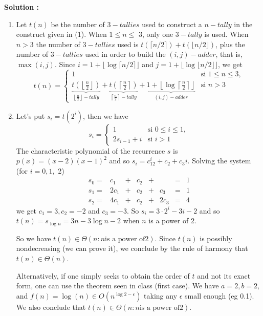 \documentclass[11pt]{article} %
\newenvironment{solution}[1][\unskip]{%
	\par
	\noindent
	\textbf{Solution #1:}
	\noindent}
{\medskip}
\begin{document}
\begin{solution}
\begin{enumerate}
			
		\item {Let $ t (n) $ be the number of $ 3-tallies $ used to construct a $ n-tally $ in the construct given in (1). When $ 1 \leq n \leq $ 3, only one $ 3-tally $ is used. When $ n> 3 $ the number of $ 3-tallies $ used is $ t (\lceil n / 2 \rceil) + t (\lfloor n / 2 \rfloor) $, plus the number of $ 3-tallies $ used in order to build the $ (i, j) -adder $, that is, $ \max (i, j) $. Since $ i = 1 + \lfloor \log \lceil n / 2 \rceil \rfloor $ and $ j = 1 + \lfloor \log \lfloor n / 2 \rfloor \rfloor $, we get
				\begin{equation}
				t(n)=\left\{
				\begin{array}{ll}
				1 & \text{si } 1\leq n \leq 3,\\\underbrace{t(\left\lfloor\frac{n}{2}\right\rfloor)}_{\left\lfloor\frac{n}{2}\right\rfloor -tally}+
				\underbrace{t(\left\lceil\frac{n}{2}\right\rceil)}_{\left\lceil\frac{n}{2}\right\rceil -tally}+  \underbrace{1 + \left\lfloor \log \left\lceil \frac{n}{2} \right\rceil \right\rfloor}_{(i,j)-adder} & \text{si } n> 3
				\end{array} \right.
				\end{equation}}
			\item{Let's put $ s_i = t (2 ^ i) $, then we have
				\begin{equation*}
				s_i=\left\{
				\begin{array}{ll}
				1 & \text{si } 0\leq i \leq 1,\\
				2s_{i-1} + i & \text{si } i>1
				\end{array} \right.
				\end{equation*}
				The characteristic polynomial of the recurrence $ s $ is $ p (x) = (x-2) (x-1) ^ 2 $ and so $ s_i = c_12 ^ i + c_2 + c_3 i $. Solving the system (for $ i = 0, 1, $ 2)
				\begin{equation*}
				\begin{array}{llllllll}
				s_0 =& c_1 & + & c_2 & + & & = & 1\\
				s_1 =& 2c_1 & + & c_2 & + & c_3 & = & 1\\
				s_2 =& 4c_1 & + & c_2 & + & 2c_3 & = & 4
				\end{array}
				\end{equation*}
				we get $ c_1 = 3, c_2 = -2 $ and $ c_3 = -3 $. So $ s_i = 3 \cdot 2 ^ i - 3i -2 $ and so $ t (n) = s _ {\log n} = 3n - 3 \log n -2 $ when $ n $ is a power of 2.

				So we have $ t (n) \in \Theta (n: n \text {is a power of} 2) $. Since $ t (n) $ is possibly nondecreasing (we can prove it), we conclude by the rule of harmony that $ t (n) \in \Theta (n) $.

				Alternatively, if one simply seeks to obtain the order of $ t $ and not its exact form, one can use the theorem seen in class (first case). We have $ a = 2, b = 2, $ and $ f (n) = \log (n) \in O (n ^ {\log 2 - \epsilon}) $ taking any $ \epsilon $ small enough (eg 0.1). We also conclude that $ t (n) \in \Theta (n: n \text {is a power of} 2) $.
			}
		\end{enumerate}
	\end{solution}
	
\end{document}
